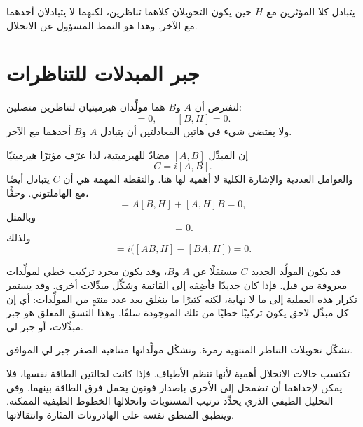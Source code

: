 يتبادل كلا المؤثرين مع \(H\) حين يكون التحويلان كلاهما تناظرين، لكنهما لا يتبادلان أحدهما مع الآخر. وهذا هو النمط المسؤول عن الانحلال.

\begin{classroomqa}
\end{classroomqa}

\section{جبر المبدلات للتناظرات}

لنفترض أن \(A\) و\(B\) هما مولِّدان هيرميتيان لتناظرين متصلين:
\begin{equation}
[A,H]=0,
\qquad
[B,H]=0.
\end{equation}
ولا يقتضي شيء في هاتين المعادلتين أن يتبادل \(A\) و\(B\) أحدهما مع الآخر.

إن المبدِّل \([A,B]\) مضادّ للهيرميتية، لذا عرّف مؤثرًا هيرميتيًا
\begin{equation}
C=i[A,B].
\end{equation}
والعوامل العددية والإشارة الكلية لا أهمية لها هنا. والنقطة المهمة هي أن \(C\) يتبادل أيضًا مع الهاملتوني. وحقًّا،
\begin{equation}
[AB,H]
=A[B,H]+[A,H]B=0,
\end{equation}
وبالمثل
\begin{equation}
[BA,H]=0.
\end{equation}
ولذلك
\begin{equation}
[C,H]
=i\bigl([AB,H]-[BA,H]\bigr)=0.
\end{equation}

قد يكون المولِّد الجديد \(C\) مستقلًا عن \(A\) و\(B\)، وقد يكون مجرد تركيب خطي لمولِّدات معروفة من قبل. فإذا كان جديدًا فأضِفه إلى القائمة وشكِّل مبدِّلات أخرى. وقد يستمر تكرار هذه العملية إلى ما لا نهاية، لكنه كثيرًا ما ينغلق بعد عدد منتهٍ من المولِّدات: أي إن كل مبدِّل لاحق يكون تركيبًا خطيًا من تلك الموجودة سلفًا. وهذا النسق المغلق هو جبر مبدِّلات، أو جبر لي.

تشكّل تحويلات التناظر المنتهية زمرة. وتشكّل مولِّداتها متناهية الصغر جبر لي الموافق.

تكتسب حالات الانحلال أهمية لأنها تنظم الأطياف. فإذا كانت لحالتين الطاقة نفسها، فلا يمكن لإحداهما أن تضمحل إلى الأخرى بإصدار فوتون يحمل فرق الطاقة بينهما. وفي التحليل الطيفي الذري يحدِّد ترتيب المستويات وانحلالها الخطوط الطيفية الممكنة. وينطبق المنطق نفسه على الهادرونات المثارة وانتقالاتها.

